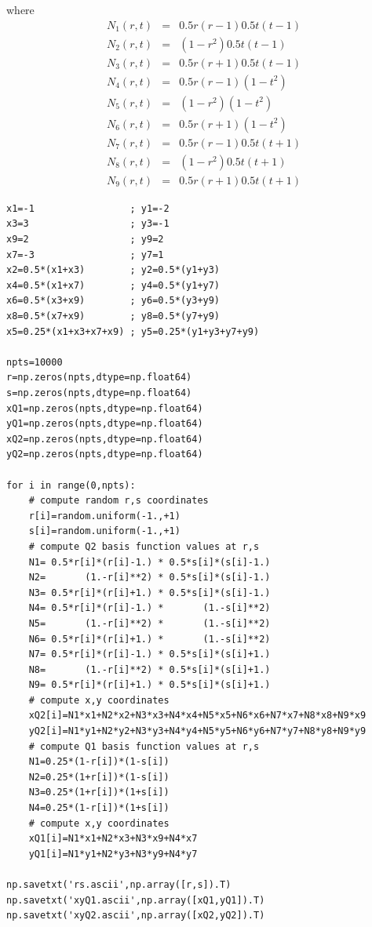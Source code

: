 where
\begin{eqnarray}
N_1(r,t)&=& 0.5r(r-1)  0.5t(t-1) \nonumber\\
N_2(r,t)&=&      (1-r^2)  0.5t(t-1) \nonumber\\
N_3(r,t)&=& 0.5r(r+1)  0.5t(t-1) \nonumber\\
N_4(r,t)&=& 0.5r(r-1)       (1-t^2) \nonumber\\
N_5(r,t)&=&      (1-r^2)       (1-t^2) \nonumber\\
N_6(r,t)&=& 0.5r(r+1)       (1-t^2) \nonumber\\
N_7(r,t)&=& 0.5r(r-1)  0.5t(t+1) \nonumber\\
N_8(r,t)&=&      (1-r^2)  0.5t(t+1) \nonumber\\
N_9(r,t)&=& 0.5r(r+1)  0.5t(t+1) \nonumber
\end{eqnarray}


\begin{lstlisting}
x1=-1                 ; y1=-2
x3=3                  ; y3=-1
x9=2                  ; y9=2
x7=-3                 ; y7=1
x2=0.5*(x1+x3)        ; y2=0.5*(y1+y3)
x4=0.5*(x1+x7)        ; y4=0.5*(y1+y7)
x6=0.5*(x3+x9)        ; y6=0.5*(y3+y9)
x8=0.5*(x7+x9)        ; y8=0.5*(y7+y9)
x5=0.25*(x1+x3+x7+x9) ; y5=0.25*(y1+y3+y7+y9)

npts=10000
r=np.zeros(npts,dtype=np.float64)   
s=np.zeros(npts,dtype=np.float64)   
xQ1=np.zeros(npts,dtype=np.float64)   
yQ1=np.zeros(npts,dtype=np.float64)   
xQ2=np.zeros(npts,dtype=np.float64)   
yQ2=np.zeros(npts,dtype=np.float64)   

for i in range(0,npts):
    # compute random r,s coordinates
    r[i]=random.uniform(-1.,+1)
    s[i]=random.uniform(-1.,+1)
    # compute Q2 basis function values at r,s
    N1= 0.5*r[i]*(r[i]-1.) * 0.5*s[i]*(s[i]-1.)
    N2=       (1.-r[i]**2) * 0.5*s[i]*(s[i]-1.)
    N3= 0.5*r[i]*(r[i]+1.) * 0.5*s[i]*(s[i]-1.)
    N4= 0.5*r[i]*(r[i]-1.) *       (1.-s[i]**2)
    N5=       (1.-r[i]**2) *       (1.-s[i]**2)
    N6= 0.5*r[i]*(r[i]+1.) *       (1.-s[i]**2)
    N7= 0.5*r[i]*(r[i]-1.) * 0.5*s[i]*(s[i]+1.)
    N8=       (1.-r[i]**2) * 0.5*s[i]*(s[i]+1.)
    N9= 0.5*r[i]*(r[i]+1.) * 0.5*s[i]*(s[i]+1.)
    # compute x,y coordinates
    xQ2[i]=N1*x1+N2*x2+N3*x3+N4*x4+N5*x5+N6*x6+N7*x7+N8*x8+N9*x9
    yQ2[i]=N1*y1+N2*y2+N3*y3+N4*y4+N5*y5+N6*y6+N7*y7+N8*y8+N9*y9
    # compute Q1 basis function values at r,s
    N1=0.25*(1-r[i])*(1-s[i])
    N2=0.25*(1+r[i])*(1-s[i])
    N3=0.25*(1+r[i])*(1+s[i])
    N4=0.25*(1-r[i])*(1+s[i])
    # compute x,y coordinates
    xQ1[i]=N1*x1+N2*x3+N3*x9+N4*x7
    yQ1[i]=N1*y1+N2*y3+N3*y9+N4*y7

np.savetxt('rs.ascii',np.array([r,s]).T)
np.savetxt('xyQ1.ascii',np.array([xQ1,yQ1]).T)
np.savetxt('xyQ2.ascii',np.array([xQ2,yQ2]).T)
\end{lstlisting}

